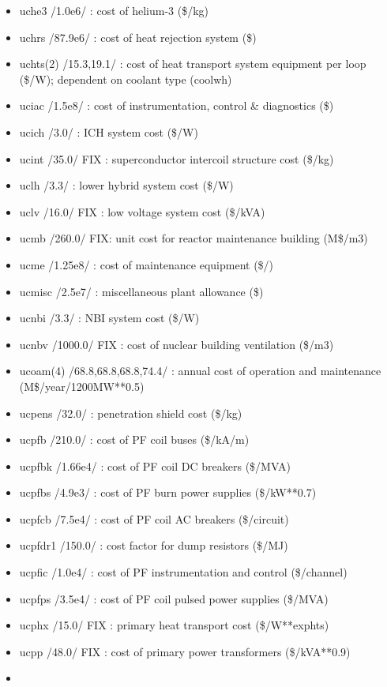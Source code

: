 \documentclass[]{article}
\begin{document}
\begin{itemize}
\item
  uche3 /1.0e6/ : cost of helium-3 (\$/kg)
\item
  uchrs /87.9e6/ : cost of heat rejection system (\$)
\item
  uchts(2) /15.3,19.1/ : cost of heat transport system equipment per
  loop (\$/W); dependent on coolant type (coolwh)
\item
  uciac /1.5e8/ : cost of instrumentation, control \& diagnostics (\$)
\item
  ucich /3.0/ : ICH system cost (\$/W)
\item
  ucint /35.0/ FIX : superconductor intercoil structure cost (\$/kg)
\item
  uclh /3.3/ : lower hybrid system cost (\$/W)
\item
  uclv /16.0/ FIX : low voltage system cost (\$/kVA)
\item
  ucmb /260.0/ FIX: unit cost for reactor maintenance building (M\$/m3)
\item
  ucme /1.25e8/ : cost of maintenance equipment (\$/)
\item
  ucmisc /2.5e7/ : miscellaneous plant allowance (\$)
\item
  ucnbi /3.3/ : NBI system cost (\$/W)
\item
  ucnbv /1000.0/ FIX : cost of nuclear building ventilation (\$/m3)
\item
  ucoam(4) /68.8,68.8,68.8,74.4/ : annual cost of operation and
  maintenance (M\$/year/1200MW**0.5)
\item
  ucpens /32.0/ : penetration shield cost (\$/kg)
\item
  ucpfb /210.0/ : cost of PF coil buses (\$/kA/m)
\item
  ucpfbk /1.66e4/ : cost of PF coil DC breakers (\$/MVA)
\item
  ucpfbs /4.9e3/ : cost of PF burn power supplies (\$/kW**0.7)
\item
  ucpfcb /7.5e4/ : cost of PF coil AC breakers (\$/circuit)
\item
  ucpfdr1 /150.0/ : cost factor for dump resistors (\$/MJ)
\item
  ucpfic /1.0e4/ : cost of PF instrumentation and control (\$/channel)
\item
  ucpfps /3.5e4/ : cost of PF coil pulsed power supplies (\$/MVA)
\item
  ucphx /15.0/ FIX : primary heat transport cost (\$/W**exphts)
\item
  ucpp /48.0/ FIX : cost of primary power transformers (\$/kVA**0.9)
\item

\end{itemize}
\end{document}
